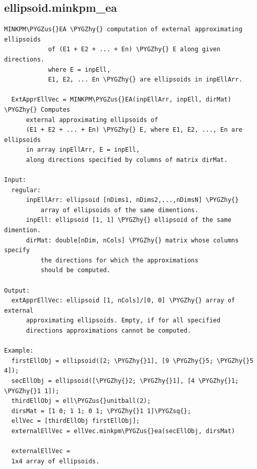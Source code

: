 \documentclass[letterpaper,10pt,english]{sphinxmanual}
\def\PYGZus{\char`\_}
\def\PYGZhy{\char`\-}
\def\PYGZsq{\char`\'}
\begin{document}
\subsection{ellipsoid.minkpm\_ea}
\label{chap_functions:ellipsoid-minkpm-ea}
\begin{Verbatim}[commandchars=\\\{\}]
MINKPM\PYGZus{}EA \PYGZhy{} computation of external approximating ellipsoids
            of (E1 + E2 + ... + En) \PYGZhy{} E along given directions.
            where E = inpEll,
            E1, E2, ... En \PYGZhy{} are ellipsoids in inpEllArr.

  ExtApprEllVec = MINKPM\PYGZus{}EA(inpEllArr, inpEll, dirMat) \PYGZhy{} Computes
      external approximating ellipsoids of
      (E1 + E2 + ... + En) \PYGZhy{} E, where E1, E2, ..., En are ellipsoids
      in array inpEllArr, E = inpEll,
      along directions specified by columns of matrix dirMat.

Input:
  regular:
      inpEllArr: ellipsoid [nDims1, nDims2,...,nDimsN] \PYGZhy{}
          array of ellipsoids of the same dimentions.
      inpEll: ellipsoid [1, 1] \PYGZhy{} ellipsoid of the same dimention.
      dirMat: double[nDim, nCols] \PYGZhy{} matrix whose columns specify
          the directions for which the approximations
          should be computed.

Output:
  extApprEllVec: ellipsoid [1, nCols]/[0, 0] \PYGZhy{} array of external
      approximating ellipsoids. Empty, if for all specified
      directions approximations cannot be computed.

Example:
  firstEllObj = ellipsoid([2; \PYGZhy{}1], [9 \PYGZhy{}5; \PYGZhy{}5 4]);
  secEllObj = ellipsoid([\PYGZhy{}2; \PYGZhy{}1], [4 \PYGZhy{}1; \PYGZhy{}1 1]);
  thirdEllObj = ell\PYGZus{}unitball(2);
  dirsMat = [1 0; 1 1; 0 1; \PYGZhy{}1 1]\PYGZsq{};
  ellVec = [thirdEllObj firstEllObj];
  externalEllVec = ellVec.minkpm\PYGZus{}ea(secEllObj, dirsMat)

  externalEllVec =
  1x4 array of ellipsoids.
\end{Verbatim}
\end{document}
